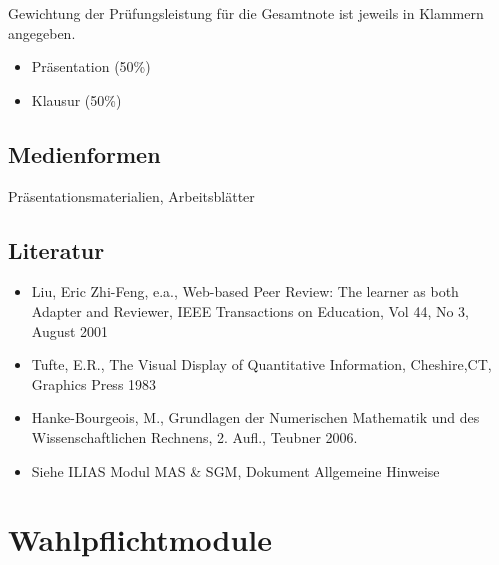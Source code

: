Gewichtung der Prüfungsleistung für die Gesamtnote ist jeweils in
Klammern angegeben.

\begin{itemize}
\tightlist
\item
  Präsentation (50\%)
\item
  Klausur (50\%)
\end{itemize}

\section*{Medienformen\label{/mi-2017/modulbeschreibungen-master/MA_All_Modul_Mathematik}}\label{medienformenpathlabelmi-2017modulbeschreibungen-mastermaux5fallux5fmodulux5fmathematik}

Präsentationsmaterialien, Arbeitsblätter

\section*{Literatur\label{/mi-2017/modulbeschreibungen-master/MA_All_Modul_Mathematik}}\label{literaturpathlabelmi-2017modulbeschreibungen-mastermaux5fallux5fmodulux5fmathematik}

\begin{itemize}
\tightlist
\item
  Liu, Eric Zhi-Feng, e.a., Web-based Peer Review: The learner as both
  Adapter and Reviewer, IEEE Transactions on Education, Vol 44, No 3,
  August 2001
\item
  Tufte, E.R., The Visual Display of Quantitative Information,
  Cheshire,CT, Graphics Press 1983
\item
  Hanke-Bourgeois, M., Grundlagen der Numerischen Mathematik und des
  Wissenschaftlichen Rechnens, 2. Aufl., Teubner 2006.
\item
  Siehe ILIAS Modul MAS \& SGM, Dokument Allgemeine Hinweise
\end{itemize}

\chapter{Wahlpflichtmodule\label{/mi-2017/modulbeschreibungen-master/MA_All_Modul_Wahlpflichtmodule}}\label{wahlpflichtmodulepathlabelmi-2017modulbeschreibungen-mastermaux5fallux5fmodulux5fwahlpflichtmodule}

